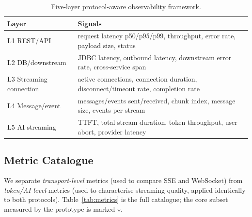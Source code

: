 \documentclass[11pt]{article}
\begin{document}
\begin{table}[H]
\centering\small
\caption{Five-layer protocol-aware observability framework.}
\label{tab:layers}
\begin{tabularx}{\textwidth}{@{}l Y@{}}
\toprule
Layer & Signals \\
\midrule
L1 REST/API & request latency p50/p95/p99, throughput, error rate, payload size, status \\
L2 DB/downstream & JDBC latency, outbound latency, downstream error rate, cross-service span \\
L3 Streaming connection & active connections, connection duration, disconnect/timeout rate, completion rate \\
L4 Message/event & messages/events sent/received, chunk index, message size, events per stream \\
L5 AI streaming & TTFT, total stream duration, token throughput, user abort, provider latency \\
\bottomrule
\end{tabularx}
\end{table}

\subsection{Metric Catalogue}
We separate \emph{transport-level} metrics (used to compare SSE and WebSocket) from \emph{token/AI-level} metrics (used to characterise streaming quality, applied identically to both protocols). Table~\ref{tab:metrics} is the full catalogue; the core subset measured by the prototype is marked $\star$.
\end{document}
